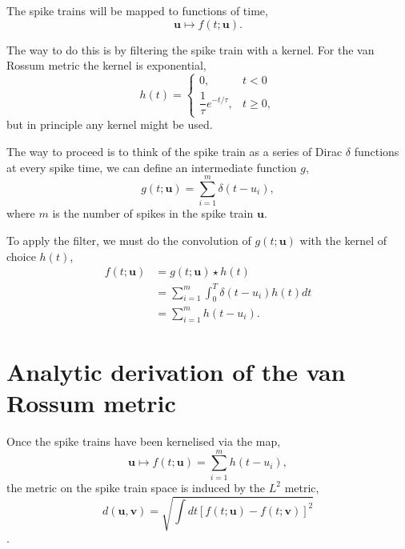 \documentclass[10pt,a4paper]{book}
\begin{document}
The spike trains will be mapped to functions of time,
\begin{equation}
\mathbf{u} \mapsto f(t;\mathbf{u}).
\end{equation}


The way to do this is by filtering the spike train with a kernel. For the van Rossum metric the kernel is exponential,
\begin{equation}
h(t) = \left\{
\begin{matrix}
0, & t < 0 \\
\dfrac{1}{\tau} e^{-t/\tau}, & t \ge 0,
\end{matrix}
\right.
\end{equation}
but in principle any kernel might be used.

The way to proceed is to think of the spike train as a series of Dirac $\delta$ functions at every spike time, we can define an intermediate function $g$,
\begin{equation}
g(t;\mathbf{u}) = \sum_{i=1}^{m} \delta(t - u_i),
\end{equation}
where $m$ is the number of spikes in the spike train $\mathbf{u}$.

To apply the filter, we must do the convolution of $g(t;\mathbf{u})$ with the kernel of choice $h(t)$,
\begin{align}
f(t;\mathbf{u}) & = g(t;\mathbf{u})\star h(t) \nonumber \\
& = \sum_{i=1}^{m}\int_{0}^{T} \delta(t - u_i)h(t)dt \nonumber \\
& = \sum_{i=1}^{m}h(t - u_i).
\end{align}


\section{Analytic derivation of the van Rossum metric}

Once the spike trains have been kernelised via the map,
\begin{equation}
\mathbf{u} \mapsto f(t;\mathbf{u}) = \sum_{i=1}^{m}h(t - u_i),
\end{equation}
the metric on the spike train space is induced by the $L^2$ metric,
\begin{equation} \label{eq:spike_metric}
d(\mathbf{u}, \mathbf{v}) = \sqrt{\int dt \left[f(t; \mathbf{u}) - f(t;\mathbf{v}) \right]^2}
\end{equation}.
\end{document}
